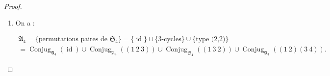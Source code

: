 \documentclass[french]{book}
\theoremstyle{definition}
\theoremstyle{remark}
\newtheorem*{remark}{Remarque}
\begin{document}
\begin{proof}
\begin{enumerate}
\begin{enumerate}
      \item Le stabilisateur de \(\sigma\) dans \(\mathfrak{S}_{4}\) est le centralisateur de \(\sigma\) dans \(\mathfrak{S}_{4}\) (dans ce cas précis), à savoir l'ensemble des permutations de \(\mathfrak{S}_{4}\) qui commutent avec \(\sigma\). Or :

      \begin{itemize}
        \item \(e\) commute avec \(\sigma\) ;
        \item \(\sigma\) commute avec \(\sigma\) ;
        \item \(\sigma^{-1} = \sigma^2\) commute avec \(\sigma\).
      \end{itemize}

      Puisque \(\operatorname{Stab}_{\mathfrak{S}_{4}}(\sigma)\) est d'ordre 3, on a donc :

      \[\operatorname{Stab}_{\mathfrak{S}_{4}}(\sigma) = \{ e, \sigma, \sigma^2 \}.\]

      Or les permutations \(e, \sigma, \sigma ^2\) sont toutes paires, d'où le résultat.

      \item On a \[\operatorname{Conjug}_{\mathfrak{S}_{4}}(\sigma) = \{ \text{3-cycles de } \mathfrak{S}_{4}\} = \{ (1 \ 2 \ 3), (1 \ 3 \ 2), (1 \ 2 \ 4), (1 \ 4 \ 2), (1 \ 3 \ 4), (1 \ 4 \ 3), (2 \ 3 \ 4), (2 \ 4 \ 3)\}.\]

      Cette classe de conjugaison dans \(\mathfrak{S}_{4}\) se décompose en deux classes de conjugaison dans \(\mathfrak{S}_{4}\) en quatre éléments chacune.

      \[\operatorname{Conjug}_{\mathfrak{A}_4}((1 \ 2 \ 3)) = \{ (1 \ 2 \ 3), (1 \ 4 \ 2), (1 \ 3 \ 4), (2 \ 4 \ 3) \}\]

      et

      \[\operatorname{Conjug}_{\mathfrak{S}_{4}}((1 \ 3 \ 2)) = \{ (1 \ 3 \ 2), (1 \ 2 \ 4), (1 \ 4 \ 3), (2 \ 3 \ 4) \}.\]

      \begin{remark}
        En revanche, les types (2,2) constituent une classe de conjugaison dans \(\mathfrak{A}_4\), car il existe une permutation impaire qui commute avec \((1 \ 2)(3 \ 4)\), à savoir \((1 \ 2)\).
      \end{remark}
    \end{enumerate}

    \item On a :

    \begin{gather*}
      \mathfrak{A}_4 = \{ \text{permutations paires de } \mathfrak{S}_{4}\} = \{ \operatorname{id}\} \cup \{ \text{3-cycles} \} \cup \{ \text{type (2,2)}\} \\
      = \operatorname{Conjug}_{\mathfrak{A}_{4}}(\operatorname{id}) \cup \operatorname{Conjug}_{\mathfrak{A}_{4}}((1 \ 2 \ 3)) \cup\operatorname{Conjug}_{\mathfrak{S}_{4}}((1 \ 3 \ 2)) \cup  \operatorname{Conjug}_{\mathfrak{A}_{4}}((1 \ 2)(3 \ 4)).
    \end{gather*}


\end{enumerate}
\end{proof}
\end{document}
